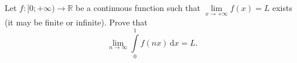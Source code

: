 Let \(f\colon [0;+\infty)\to \mathbb R\) be a continuous function such that \(\lim\limits_{x\to +\infty} f(x)=L\) exists (it may be finite or infinite). Prove that \[ \lim\limits_{n\to\infty}\int\limits_0^{1}f(nx)\,\mathrm{d}x=L. \]